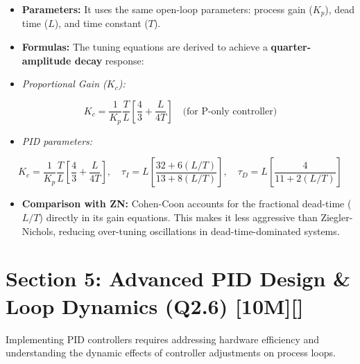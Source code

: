 \begin{itemize}
  \item \textbf{Parameters:} It uses the same open-loop parameters: process gain ($K_p$), dead time ($L$), and time constant ($T$).
  \item \textbf{Formulas:} The tuning equations are derived to achieve a \textbf{quarter-amplitude decay} response:
  \item \textit{Proportional Gain ($K_c$):}
\end{itemize}
    \[ K_c = \frac{1}{K_p} \frac{T}{L} \left[ \frac{4}{3} + \frac{L}{4T} \right] \quad \text{(for P-only controller)} \]
\begin{itemize}
  \item \textit{PID parameters:}
\end{itemize}
    \[ K_c = \frac{1}{K_p} \frac{T}{L} \left[ \frac{4}{3} + \frac{L}{4T} \right], \quad \tau_I = L \left[ \frac{32 + 6(L/T)}{13 + 8(L/T)} \right], \quad \tau_D = L \left[ \frac{4}{11 + 2(L/T)} \right] \]
\begin{itemize}
  \item \textbf{Comparison with ZN:} Cohen-Coon accounts for the fractional dead-time ($L/T$) directly in its gain equations. This makes it less aggressive than Ziegler-Nichols, reducing over-tuning oscillations in dead-time-dominated systems.
\end{itemize}


\section{Section 5: Advanced PID Design \& Loop Dynamics (Q2.6) [10M][]}

Implementing PID controllers requires addressing hardware efficiency and understanding the dynamic effects of controller adjustments on process loops.

